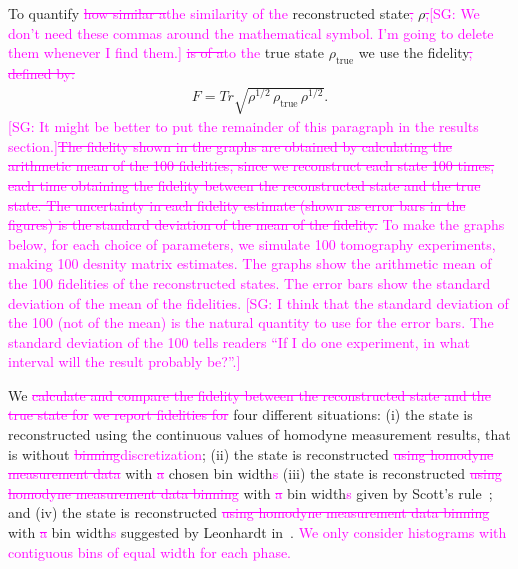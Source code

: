 \documentclass[
reprint,
superscriptaddress,
showpacs,
amsmath,
amssymb,
aps,
pra,
longbibliography
]{revtex4-1}
\providecommand{\aucmnt}[1]{#1}
\providecommand{\editcolor}[2]{\textcolor{#1}{#2}}
\providecommand{\aucmnt}[1]{}
\providecommand{\editcolor}[2]{#2}
\newcommand{\SG}[1]{\editcolor{magenta}{#1}}
\newcommand{\SGs}[1]{\aucmnt{\editcolor{magenta}{\sout{#1}}}}
\newcommand{\SGc}[1]{\aucmnt{\editcolor{magenta}{[SG: #1]}}}
\newcommand{\rhotrue}{\rho_{\text{true}}}
\begin{document}
To quantify \SGs{how similar a}\SG{the similarity of the}
reconstructed state\SGs{,} $\rho$\SGs{,}\SGc{We don't need these
  commas around the mathematical symbol.  I'm going to delete them
  whenever I find them.} \SGs{is of a}\SG{to the} true state
$\rhotrue$ we use the fidelity\SGs{, defined by:}
\begin{eqnarray}
  F = Tr \sqrt{\rho^{1/2}\, \rhotrue \, \rho^{1/2}}.
\end{eqnarray}
\SGc{It might be better to put the remainder of this paragraph in the
  results section.}\SGs{The fidelity shown in the graphs are obtained
  by calculating the arithmetic mean of the 100 fidelities, since we
  reconstruct each state 100 times, each time obtaining the fidelity
  between the reconstructed state and the true state. The uncertainty
  in each fidelity estimate (shown as error bars in the figures) is
  the standard deviation of the mean of the fidelity.} \SG{To make the
  graphs below, for each choice of parameters, we simulate 100
  tomography experiments, making 100 desnity matrix estimates.  The
  graphs show the arithmetic mean of the 100 fidelities of the
  reconstructed states.  The error bars show the standard deviation of
  the mean of the fidelities.} \SGc{I think that the standard
  deviation of the 100 (not of the mean) is the natural quantity to
  use for the error bars.  The standard deviation of the 100 tells
  readers ``If I do one experiment, in what interval will the result
  probably be?''.}

We \SGs{calculate and compare the fidelity between the reconstructed
  state and the true state for} \SGs{we report fidelities for} four
different situations: (i) the state is reconstructed using the
continuous values of homodyne measurement results, that is without
\SGs{binning}\SG{discretization}; (ii) the state is reconstructed
\SGs{using homodyne measurement data} with \SGs{a} chosen bin
width\SG{s} (iii) the state is reconstructed \SGs{using homodyne
  measurement data binning} with \SGs{a} bin width\SG{s} given by
Scott's rule~\cite{Scott2010}; and (iv) the state is reconstructed
\SGs{using homodyne measurement data binning} with \SGs{a} bin
width\SG{s} suggested by Leonhardt in~\cite{Leonhardt1997}. \SG{We
  only consider histograms with contiguous bins of equal width for
  each phase.}
\end{document}
